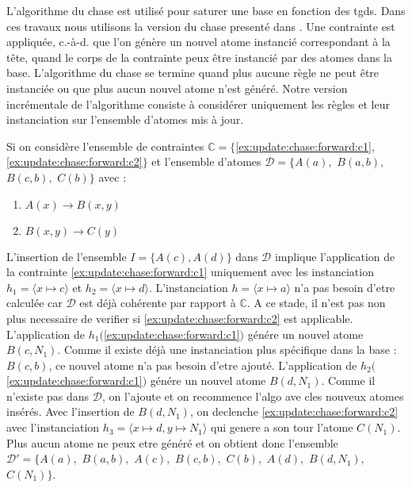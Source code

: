 L'algorithme du \gls{chase} \cite{ahoTheoryJoinsRelational1979,maierTestingImplicationsData1979} est utilisé pour saturer une base en fonction des \glspl{tgd}.
Dans ces travaux nous utilisons la version du chase presenté dans \cite{chabinConsistentUpdatingDatabases2020}.
Une contrainte est appliquée, c.-à-d. que l'on génère un nouvel atome instancié correspondant à la tête, quand le corps de la contrainte peux être instancié par des atomes dans la base.
L'algorithme du \gls{chase} se termine quand plus aucune règle ne peut être instanciée ou que plus aucun nouvel atome n'est généré.
Notre version incrémentale de l'algorithme consiste à considérer uniquement les règles et leur instanciation sur l'ensemble d'atomes mis à jour.

\begin{example}
    \label{ex:update:chase:forward}
    Si on considère l'ensemble de contraintes $\mathbb{C} = \{$\ref{ex:update:chase:forward:c1}, \ref{ex:update:chase:forward:c2}$\}$ et l'ensemble d'atomes $\mathcal{D} = \{A(a),$ $B(a, b),$ $B(c, b),$ $C(b)\}$ avec :

    \begin{multicols}{2}
        \begin{enumerate}[label=\textbf{$c_\arabic*$ :},ref=$c_\arabic*$]
            \centering
            \item $A(x) \to B(x, y)$ \label{ex:update:chase:forward:c1}
            \item $B(x, y) \to C(y)$ \label{ex:update:chase:forward:c2}
        \end{enumerate}
    \end{multicols}

    L'insertion de l'ensemble $I = \{A(c), A(d)\}$ dans $\mathcal{D}$ implique l'application de la contrainte \ref{ex:update:chase:forward:c1} uniquement avec les instanciation $h_1 = \langle x \mapsto c \rangle$ et $h_2 = \langle x \mapsto d \rangle$.
    L'instanciation $h = \langle x \mapsto a \rangle$ n'a pas besoin d'etre calculée car $\mathcal{D}$ est déjà cohérente par rapport à $\mathbb{C}$.
    A ce stade, il n'est pas non plus necessaire de verifier si \ref{ex:update:chase:forward:c2} est applicable.
    L'application de $h_1($\ref{ex:update:chase:forward:c1}$)$ génére un nouvel atome $B(c, N_1)$.
    Comme il existe déjà une instanciation plus spécifique dans la base : $B(c, b)$, ce nouvel atome n'a pas besoin d'etre ajouté.
    L'application de $h_2($\ref{ex:update:chase:forward:c1}$)$ génére un nouvel atome $B(d, N_1)$.
    Comme il n'existe pas dans $\mathcal{D}$, on l'ajoute et on recommence l'algo ave cles nouveux atomes insérés.
    Avec l'insertion de $B(d, N_1)$, on declenche \ref{ex:update:chase:forward:c2} avec l'instanciation $h_3 = \langle x \mapsto d, y \mapsto N_1 \rangle$ qui genere a son tour l'atome $C(N_1)$.
    Plus aucun atome ne peux etre généré et on obtient donc l'ensemble $\mathcal{D}' = \{A(a),$ $B(a, b),$ $A(c),$ $B(c, b),$ $C(b),$ $A(d),$ $B(d, N_1),$ $C(N_1)\}$.
\end{example}

